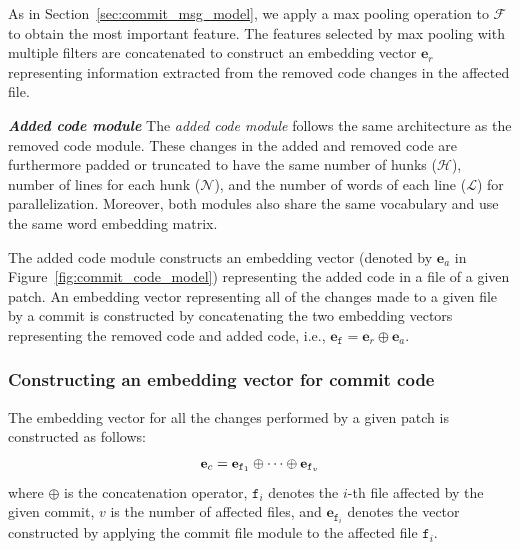 As in Section~\ref{sec:commit_msg_model}, we apply a max pooling operation
to $\mathcal{F}$ to obtain the most important feature.
The features selected by max pooling with multiple filters are concatenated to
construct an embedding vector $\textbf{e}_r$ representing information
extracted from the removed code changes in the affected file.

\textbf{\textit{Added code module}} The \textit{added code module} follows
the same architecture as the removed code module. These changes in the
added and removed code are furthermore padded or truncated to have the same
number of hunks ($\mathcal{H}$), number of lines for each hunk
($\mathcal{N}$), and the number of words of each line ($\mathcal{L}$) for
parallelization. Moreover, both modules also share the same vocabulary and
use the same word embedding matrix.

The added code module
constructs an embedding vector (denoted by $\textbf{e}_a$ in Figure~\ref{fig:commit_code_model}) representing the added code in a file
of a given patch. An embedding vector representing all of the changes made to a given file by a commit is constructed by
concatenating the two embedding vectors representing the removed code and
added code, i.e., $\textbf{e}_\texttt{f} = \textbf{e}_r \oplus \textbf{e}_a$. 




\subsubsection{Constructing an embedding vector for commit code}
\label{sec:construct_commit_code}
The embedding vector for all the changes performed by a given patch is constructed as follows:
\begin{equation} \footnotesize
\label{eq:commit_code_vector}
\textbf{e}_c = \textbf{e}_{\texttt{f}_1} \oplus \dots \oplus \textbf{e}_{\texttt{f}_v}
\end{equation}
where $\oplus$ is the concatenation operator, $\texttt{f}_i$ denotes the $i$-th file affected by the given commit, $v$ is the number of affected files, and $\textbf{e}_{\texttt{f}_i}$ denotes the vector constructed by applying the commit file module to the affected file $\texttt{f}_i$.


